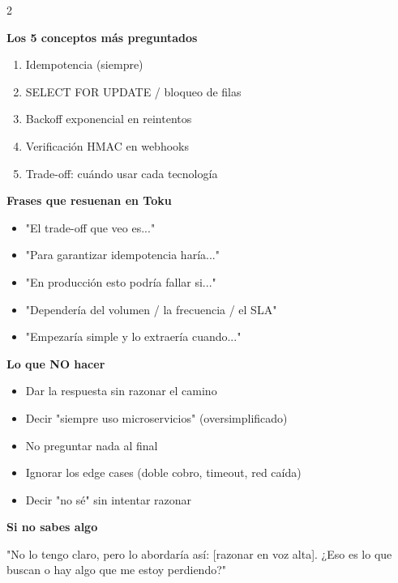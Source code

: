 \documentclass[11pt,a4paper]{article}
\begin{document}
\begin{multicols}{2}

\textbf{\textcolor{simred}{Los 5 conceptos más preguntados}}
\begin{enumerate}[leftmargin=*,noitemsep]
  \item Idempotencia (siempre)
  \item SELECT FOR UPDATE / bloqueo de filas
  \item Backoff exponencial en reintentos
  \item Verificación HMAC en webhooks
  \item Trade-off: cuándo usar cada tecnología
\end{enumerate}

\textbf{\textcolor{simred}{Frases que resuenan en Toku}}
\begin{itemize}[leftmargin=*,noitemsep]
  \item "El trade-off que veo es..."
  \item "Para garantizar idempotencia haría..."
  \item "En producción esto podría fallar si..."
  \item "Dependería del volumen / la frecuencia / el SLA"
  \item "Empezaría simple y lo extraería cuando..."
\end{itemize}

\columnbreak

\textbf{\textcolor{simred}{Lo que NO hacer}}
\begin{itemize}[leftmargin=*,noitemsep]
  \item Dar la respuesta sin razonar el camino
  \item Decir "siempre uso microservicios" (oversimplificado)
  \item No preguntar nada al final
  \item Ignorar los edge cases (doble cobro, timeout, red caída)
  \item Decir "no sé" sin intentar razonar
\end{itemize}

\textbf{\textcolor{simred}{Si no sabes algo}}
\begin{tcolorbox}[colback=tipgreen!8,colframe=tipgreen]
"No lo tengo claro, pero lo abordaría así:
[razonar en voz alta]. ¿Eso es lo que buscan
o hay algo que me estoy perdiendo?"
\end{tcolorbox}

\end{multicols}
\end{document}
